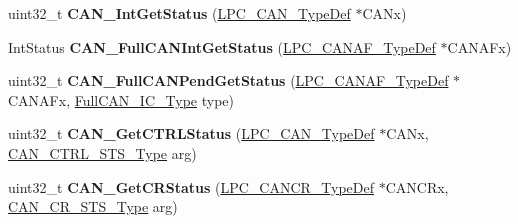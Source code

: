 \begin{DoxyCompactItemize}
\item 
\hypertarget{group___c_a_n___public___functions_ga101654b740ce6d63c68c32e771e79332}{uint32\-\_\-t {\bfseries \-C\-A\-N\-\_\-\-Int\-Get\-Status} (\hyperlink{struct_l_p_c___c_a_n___type_def}{\-L\-P\-C\-\_\-\-C\-A\-N\-\_\-\-Type\-Def} $\ast$\-C\-A\-Nx)}\label{group___c_a_n___public___functions_ga101654b740ce6d63c68c32e771e79332}

\item 
\hypertarget{group___c_a_n___public___functions_ga5d082a04fd6931e4f98b4d88a0708865}{\-Int\-Status {\bfseries \-C\-A\-N\-\_\-\-Full\-C\-A\-N\-Int\-Get\-Status} (\hyperlink{struct_l_p_c___c_a_n_a_f___type_def}{\-L\-P\-C\-\_\-\-C\-A\-N\-A\-F\-\_\-\-Type\-Def} $\ast$\-C\-A\-N\-A\-Fx)}\label{group___c_a_n___public___functions_ga5d082a04fd6931e4f98b4d88a0708865}

\item 
\hypertarget{group___c_a_n___public___functions_gac892cf634a005a2718f5c00de342f34f}{uint32\-\_\-t {\bfseries \-C\-A\-N\-\_\-\-Full\-C\-A\-N\-Pend\-Get\-Status} (\hyperlink{struct_l_p_c___c_a_n_a_f___type_def}{\-L\-P\-C\-\_\-\-C\-A\-N\-A\-F\-\_\-\-Type\-Def} $\ast$\-C\-A\-N\-A\-Fx, \hyperlink{group___c_a_n___public___types_ga68eb30e4e497ea667c93702fd807e994}{\-Full\-C\-A\-N\-\_\-\-I\-C\-\_\-\-Type} type)}\label{group___c_a_n___public___functions_gac892cf634a005a2718f5c00de342f34f}

\item 
\hypertarget{group___c_a_n___public___functions_ga563b903ab53b16b642af5ac6f3985094}{uint32\-\_\-t {\bfseries \-C\-A\-N\-\_\-\-Get\-C\-T\-R\-L\-Status} (\hyperlink{struct_l_p_c___c_a_n___type_def}{\-L\-P\-C\-\_\-\-C\-A\-N\-\_\-\-Type\-Def} $\ast$\-C\-A\-Nx, \hyperlink{group___c_a_n___public___types_gafd4d389b789aeffd24d3d164d45026cf}{\-C\-A\-N\-\_\-\-C\-T\-R\-L\-\_\-\-S\-T\-S\-\_\-\-Type} arg)}\label{group___c_a_n___public___functions_ga563b903ab53b16b642af5ac6f3985094}

\item 
\hypertarget{group___c_a_n___public___functions_gacccbec75da2b1c7be1ab643867e0ec57}{uint32\-\_\-t {\bfseries \-C\-A\-N\-\_\-\-Get\-C\-R\-Status} (\hyperlink{struct_l_p_c___c_a_n_c_r___type_def}{\-L\-P\-C\-\_\-\-C\-A\-N\-C\-R\-\_\-\-Type\-Def} $\ast$\-C\-A\-N\-C\-Rx, \hyperlink{group___c_a_n___public___types_ga6166c9b3eacd341555c3cf4ca8bb7ce4}{\-C\-A\-N\-\_\-\-C\-R\-\_\-\-S\-T\-S\-\_\-\-Type} arg)}\label{group___c_a_n___public___functions_gacccbec75da2b1c7be1ab643867e0ec57}

\end{DoxyCompactItemize}

